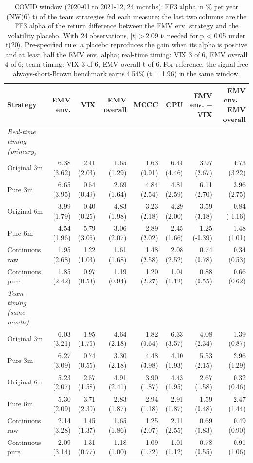 \begin{table}[htbp]
\centering
\footnotesize
\caption{COVID window (2020-01 to 2021-12, 24 months): FF3 alpha in \% per year (NW(6) t) of the team strategies fed each measure; the last two columns are the FF3 alpha of the return difference between the EMV env. strategy and the volatility placebo. With 24 observations, $|t| > 2.09$ is needed for p < 0.05 under t(20). Pre-specified rule: a placebo reproduces the gain when its alpha is positive and at least half the EMV env. alpha; real-time timing: VIX 3 of 6, EMV overall 4 of 6; team timing: VIX 3 of 6, EMV overall 6 of 6. For reference, the signal-free always-short-Brown benchmark earns 4.54\% (t = 1.96) in the same window.}
\label{tab:m1b_placebo_covid}
\begin{tabular}{lrrrrrrr}
\toprule
Strategy & EMV env. & VIX & EMV overall & MCCC & CPU & EMV env. $-$ VIX & EMV env. $-$ EMV overall \\
\midrule
\textit{Real-time timing (primary)} &  &  &  &  &  &  &  \\
Original 3m & 6.38 (3.62) & 2.41 (2.03) & 1.65 (1.29) & 1.63 (0.91) & 6.44 (4.46) & 3.97 (2.67) & 4.73 (3.22) \\
Pure 3m & 6.65 (3.95) & 0.54 (0.49) & 2.69 (1.64) & 4.84 (2.54) & 4.81 (2.59) & 6.11 (2.70) & 3.96 (2.75) \\
Original 6m & 3.99 (1.79) & 0.40 (0.25) & 4.83 (1.98) & 3.23 (2.18) & 4.29 (2.00) & 3.59 (3.18) & -0.84 (-1.16) \\
Pure 6m & 4.54 (1.96) & 5.79 (3.06) & 3.06 (2.07) & 2.89 (2.02) & 2.45 (1.66) & -1.25 (-0.39) & 1.48 (1.01) \\
Continuous raw & 1.95 (2.68) & 1.22 (1.03) & 1.61 (1.68) & 1.48 (2.58) & 2.08 (2.52) & 0.74 (0.78) & 0.34 (0.53) \\
Continuous pure & 1.85 (2.42) & 0.97 (0.53) & 1.19 (0.94) & 1.20 (2.27) & 1.04 (1.12) & 0.88 (0.55) & 0.66 (0.62) \\
\textit{Team timing (same month)} &  &  &  &  &  &  &  \\
Original 3m & 6.03 (3.21) & 1.95 (1.75) & 4.64 (2.18) & 1.82 (0.64) & 6.33 (3.57) & 4.08 (2.34) & 1.39 (0.87) \\
Pure 3m & 6.27 (3.09) & 0.74 (0.55) & 3.30 (2.18) & 4.48 (3.98) & 4.10 (1.93) & 5.53 (2.15) & 2.96 (1.29) \\
Original 6m & 5.23 (2.07) & 2.57 (1.58) & 4.91 (2.41) & 3.90 (1.87) & 4.43 (1.95) & 2.67 (1.58) & 0.32 (0.46) \\
Pure 6m & 5.30 (2.09) & 3.71 (2.30) & 2.83 (1.87) & 2.94 (1.18) & 2.91 (1.87) & 1.59 (0.48) & 2.47 (1.44) \\
Continuous raw & 2.14 (3.28) & 1.45 (1.37) & 1.65 (1.86) & 1.25 (2.07) & 2.11 (2.55) & 0.69 (0.83) & 0.49 (0.90) \\
Continuous pure & 2.09 (3.14) & 1.31 (0.77) & 1.18 (1.00) & 1.09 (1.72) & 1.01 (1.12) & 0.78 (0.55) & 0.91 (1.06) \\
\bottomrule
\end{tabular}
\end{table}
